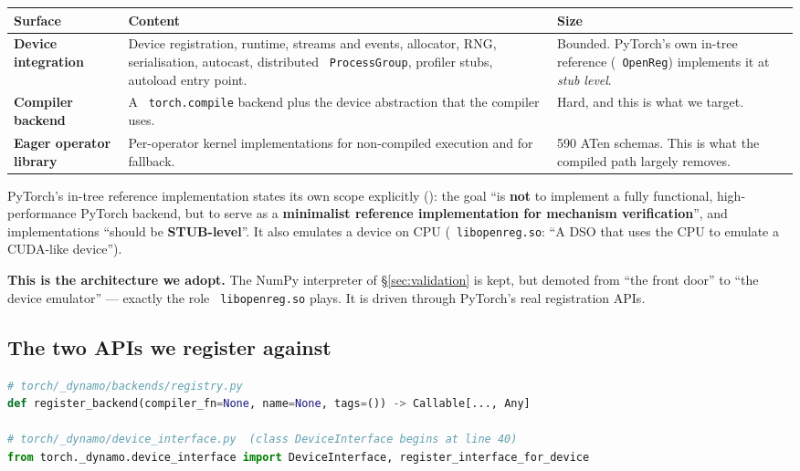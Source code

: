 \documentclass[11pt,a4paper]{article}
\newcommand{\code}[1]{\texttt{\small\hyphenchar\font=45 #1}}
\begin{document}
\begin{center}
\begin{tabularx}{\textwidth}{@{}>{\raggedright\arraybackslash}p{3.1cm} >{\raggedright\arraybackslash}X >{\raggedright\arraybackslash}p{3.0cm}@{}}
\toprule
\textbf{Surface} & \textbf{Content} & \textbf{Size} \\
\midrule
\textbf{Device integration} & Device registration, runtime, streams and events, allocator, RNG, serialisation,
autocast, distributed \code{ProcessGroup}, profiler stubs, autoload entry point. & Bounded. PyTorch's own
in-tree reference (\code{OpenReg}) implements it at \emph{stub level}. \\
\addlinespace
\textbf{Compiler backend} & A \code{torch.compile} backend plus the device abstraction that the compiler
uses. & Hard, and this is what we target. \\
\addlinespace
\textbf{Eager operator library} & Per-operator kernel implementations for non-compiled execution and for
fallback. & 2{,}590 ATen schemas. This is what the compiled path largely removes. \\
\bottomrule
\end{tabularx}
\end{center}

\noindent PyTorch's in-tree reference implementation states its own scope explicitly
(): the goal ``is
\textbf{not} to implement a fully functional, high-performance PyTorch backend, but to serve as a
\textbf{minimalist reference implementation for mechanism verification}'', and implementations ``should be
\textbf{STUB-level}''. It also emulates a device on CPU (\code{libopenreg.so}: ``A DSO that uses the CPU to
emulate a CUDA-like device'').

\noindent\textbf{This is the architecture we adopt.} The NumPy interpreter of \S\ref{sec:validation} is kept,
but demoted from ``the front door'' to ``the device emulator'' --- exactly the role \code{libopenreg.so}
plays. It is driven through PyTorch's real registration APIs.

\subsection{The two APIs we register against}

\begin{lstlisting}[language=Python]
# torch/_dynamo/backends/registry.py
def register_backend(compiler_fn=None, name=None, tags=()) -> Callable[..., Any]

# torch/_dynamo/device_interface.py  (class DeviceInterface begins at line 40)
from torch._dynamo.device_interface import DeviceInterface, register_interface_for_device
\end{lstlisting}
\end{document}
